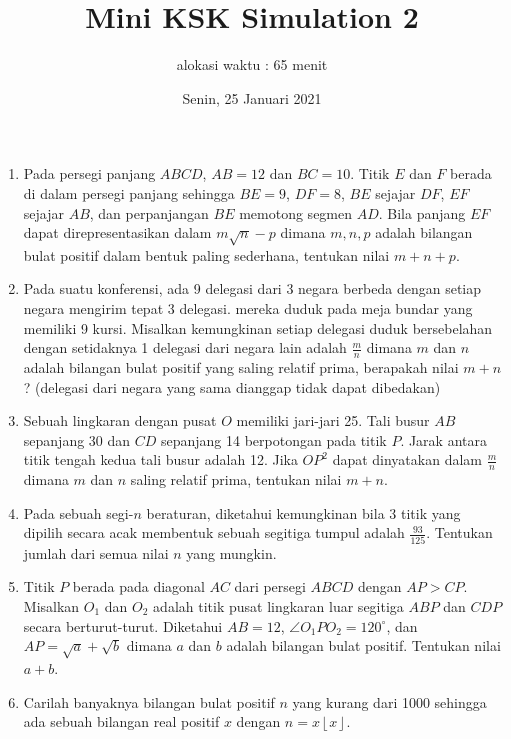 \documentclass[12pt]{scrartcl}
\title{Mini KSK Simulation 2}
\author{alokasi waktu : 65 menit}
\date{Senin, 25 Januari 2021}
\begin{document}
	\maketitle

\renewcommand*\contentsname{Daftar Isi}
\tableofcontents

\newpage
	
	\begin{enumerate}
		\item
		Pada persegi panjang $ABCD$, $AB = 12$ dan $BC=10$. Titik $E$ dan $F$ berada di dalam persegi panjang sehingga $BE=9$, $DF=8$, $BE$ sejajar $DF$, $EF$ sejajar $AB$, dan perpanjangan $BE$ memotong segmen $AD$. Bila panjang $EF$ dapat direpresentasikan dalam $m\sqrt n - p$ dimana $m,n,p$ adalah bilangan bulat positif dalam bentuk paling sederhana, tentukan nilai $m+n+p$.
		
		\item
		Pada suatu konferensi, ada 9 delegasi dari 3 negara berbeda dengan setiap negara mengirim tepat 3 delegasi. mereka duduk pada meja bundar yang memiliki 9 kursi. Misalkan kemungkinan setiap delegasi duduk bersebelahan dengan setidaknya 1 delegasi dari negara lain adalah $\frac{m}{n}$ dimana $m$ dan $n$ adalah bilangan bulat positif yang saling relatif prima, berapakah nilai $m+n$? (delegasi dari negara yang sama dianggap tidak dapat dibedakan)
		
		
		\item
		Sebuah lingkaran dengan pusat $O$ memiliki jari-jari 25. Tali busur $AB$ sepanjang 30 dan $CD$ sepanjang 14 berpotongan pada titik $P$. Jarak antara titik tengah kedua tali busur adalah 12. Jika $OP^2$ dapat dinyatakan dalam $\frac{m}{n}$ dimana $m$ dan $n$ saling relatif prima, tentukan nilai $m+n$.
		
		\item
		Pada sebuah segi-$n$ beraturan, diketahui kemungkinan bila 3 titik yang dipilih secara acak membentuk sebuah segitiga tumpul adalah $\frac{93}{125}$. Tentukan jumlah dari semua nilai $n$ yang mungkin.
		
		\item
		Titik $P$ berada pada diagonal $AC$ dari persegi $ABCD$ dengan $AP>CP$. Misalkan $O_1$ dan $O_2$ adalah titik pusat lingkaran luar segitiga $ABP$ dan $CDP$ secara berturut-turut. Diketahui $AB=12$, $\angle O_1PO_2 = 120^\circ$, dan $AP=\sqrt{a}+\sqrt{b}$ dimana $a$ dan $b$ adalah bilangan bulat positif. Tentukan nilai $a+b$.
		
		\item
		Carilah banyaknya bilangan bulat positif $n$ yang kurang dari 1000 sehingga ada sebuah bilangan real positif $x$ dengan $n=x \left \lfloor{x} \right \rfloor$.
		

\end{enumerate}
\end{document}
